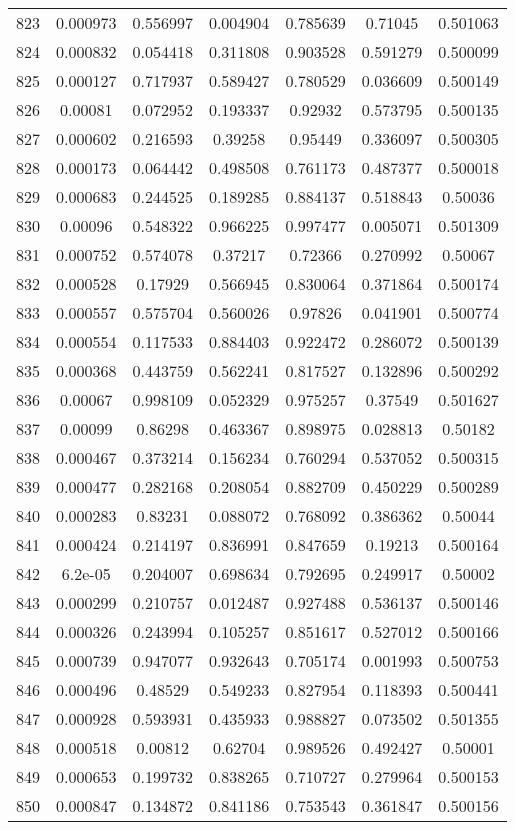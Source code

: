 \begin{table}
\begin{tabular}{c|c|c|c|c|c|c}
823 & 0.000973 & 0.556997 & 0.004904 & 0.785639 & 0.71045 & 0.501063\\
824 & 0.000832 & 0.054418 & 0.311808 & 0.903528 & 0.591279 & 0.500099\\
825 & 0.000127 & 0.717937 & 0.589427 & 0.780529 & 0.036609 & 0.500149\\
826 & 0.00081 & 0.072952 & 0.193337 & 0.92932 & 0.573795 & 0.500135\\
827 & 0.000602 & 0.216593 & 0.39258 & 0.95449 & 0.336097 & 0.500305\\
828 & 0.000173 & 0.064442 & 0.498508 & 0.761173 & 0.487377 & 0.500018\\
829 & 0.000683 & 0.244525 & 0.189285 & 0.884137 & 0.518843 & 0.50036\\
830 & 0.00096 & 0.548322 & 0.966225 & 0.997477 & 0.005071 & 0.501309\\
831 & 0.000752 & 0.574078 & 0.37217 & 0.72366 & 0.270992 & 0.50067\\
832 & 0.000528 & 0.17929 & 0.566945 & 0.830064 & 0.371864 & 0.500174\\
833 & 0.000557 & 0.575704 & 0.560026 & 0.97826 & 0.041901 & 0.500774\\
834 & 0.000554 & 0.117533 & 0.884403 & 0.922472 & 0.286072 & 0.500139\\
835 & 0.000368 & 0.443759 & 0.562241 & 0.817527 & 0.132896 & 0.500292\\
836 & 0.00067 & 0.998109 & 0.052329 & 0.975257 & 0.37549 & 0.501627\\
837 & 0.00099 & 0.86298 & 0.463367 & 0.898975 & 0.028813 & 0.50182\\
838 & 0.000467 & 0.373214 & 0.156234 & 0.760294 & 0.537052 & 0.500315\\
839 & 0.000477 & 0.282168 & 0.208054 & 0.882709 & 0.450229 & 0.500289\\
840 & 0.000283 & 0.83231 & 0.088072 & 0.768092 & 0.386362 & 0.50044\\
841 & 0.000424 & 0.214197 & 0.836991 & 0.847659 & 0.19213 & 0.500164\\
842 & 6.2e-05 & 0.204007 & 0.698634 & 0.792695 & 0.249917 & 0.50002\\
843 & 0.000299 & 0.210757 & 0.012487 & 0.927488 & 0.536137 & 0.500146\\
844 & 0.000326 & 0.243994 & 0.105257 & 0.851617 & 0.527012 & 0.500166\\
845 & 0.000739 & 0.947077 & 0.932643 & 0.705174 & 0.001993 & 0.500753\\
846 & 0.000496 & 0.48529 & 0.549233 & 0.827954 & 0.118393 & 0.500441\\
847 & 0.000928 & 0.593931 & 0.435933 & 0.988827 & 0.073502 & 0.501355\\
848 & 0.000518 & 0.00812 & 0.62704 & 0.989526 & 0.492427 & 0.50001\\
849 & 0.000653 & 0.199732 & 0.838265 & 0.710727 & 0.279964 & 0.500153\\
850 & 0.000847 & 0.134872 & 0.841186 & 0.753543 & 0.361847 & 0.500156\\
\end{tabular}
\end{table}
